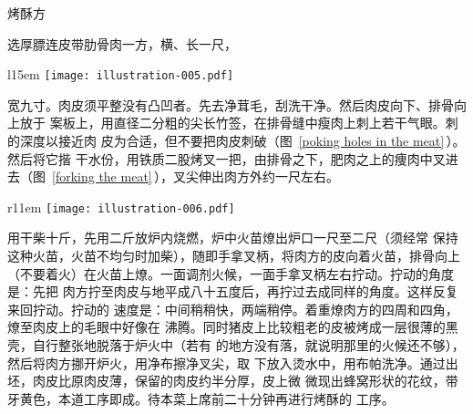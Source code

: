 \begin{recipe}{烤酥方}

\ingredients


\preparation

\step[选料及处理] 选厚膘连皮带肋骨肉一方，横、长一尺，
\begin{wrapfigure}[9]{l}{15em}%
\centering%
\vspace{-.875\baselineskip}%
\texttt{[image: illustration-005.pdf]}%
\vspace{-.125\baselineskip}%
\caption{刺气眼}
\label{poking holes in the meat}
\end{wrapfigure}
宽九寸。肉皮须平整没有凸凹者。先去净茸毛，刮洗干净。然后肉皮向下、排骨向上放于
案板上，用直径二分粗的尖长竹签，在排骨缝中瘦肉上刺上若干气眼。刺的深度以接近肉
皮为合适，但不要把肉皮刺破（图~\ref{poking holes in the meat}\,）。然后将它揩
干水份，用铁质二股烤叉一把，由排骨之下，肥肉之上的痩肉中叉进去（图~\ref{forking
the meat}\,），叉尖伸出肉方外约一尺左右。

\begin{wrapfigure}[13]{r}{11em}%
\centering%
\vspace{-2\baselineskip}%
\texttt{[image: illustration-006.pdf]}%
\vspace{-.625\baselineskip}%
\caption{叉肉}
\label{forking the meat}
\end{wrapfigure}
%

\step[出坯] 用干柴十斤，先用二斤放炉内烧燃，炉中火苗燎出炉口一尺至二尺（须经常
保持这种火苗，火苗不均匀时加柴），随即手拿叉柄，将肉方的皮向着火苗，排骨向上
（不要着火）在火苗上燎。一面调剂火候，一面手拿叉柄左右拧动。拧动的角度是：先把
肉方拧至肉皮与地平成八十五度后，再拧过去成同样的角度。这样反复来回拧动。拧动的
速度是：中间稍稍快，两端稍停。着重燎肉方的四周和四角，燎至肉皮上的毛眼中好像在
沸腾。同时猪皮上比较粗老的皮被烤成一层很薄的黑壳，自行整张地脱落于炉火中（若有
的地方没有落，就说明那里的火候还不够），然后将肉方挪开炉火，用净布擦净叉尖，取
下放入烫水中，用布帕洗净。通过出坯，肉皮比原肉皮薄，保留的肉皮约半分厚，皮上微
微现出蜂窝形状的花纹，带牙黄色，本道工序即成。待本菜上席前二十分钟再进行烤酥的
工序。


\end{recipe}
